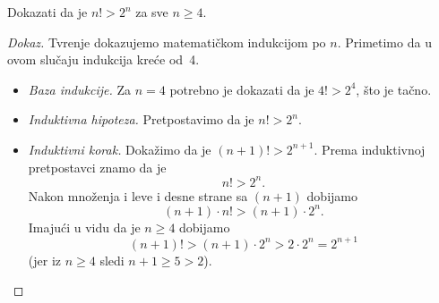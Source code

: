 \begin{EX}
  Dokazati da je $n! > 2^n$ za sve $n \ge 4$.
\end{EX}
\begin{proof}[Dokaz]
  Tvr\dj enje dokazujemo matemati\v ckom indukcijom po $n$. Primetimo da u ovom slu\v caju indukcija kre\'ce od~4.
  \begin{itemize}\itemsep -1pt
  \item
    \emph{Baza indukcije.} Za $n = 4$ potrebno je dokazati da je $4! > 2^4$, \v sto je ta\v cno.
  \item
    \emph{Induktivna hipoteza.} Pretpostavimo da je $n! > 2^n$.
  \item
    \emph{Induktivni korak.} Doka\v zimo da je $(n + 1)! > 2^{n + 1}$. Prema induktivnoj pretpostavci znamo da je
    $$
      n! > 2^n.
    $$
    Nakon mno\v zenja i leve i desne strane sa $(n + 1)$ dobijamo
    $$
      (n + 1) \cdot n! > (n + 1) \cdot 2^n.
    $$
    Imaju\'ci u vidu da je $n \ge 4$ dobijamo
    $$
      (n + 1)! > (n + 1) \cdot 2^n > 2 \cdot 2^n = 2^{n+1}
    $$
    (jer iz $n \ge 4$ sledi $n + 1 \ge 5 > 2$).\qedhere
  \end{itemize}
\end{proof}

    

